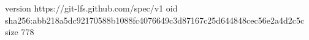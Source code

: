 version https://git-lfs.github.com/spec/v1
oid sha256:abb218a5dc92170588b1088fc4076649c3d87167c25d644848cec56e2a4d2c5c
size 778
